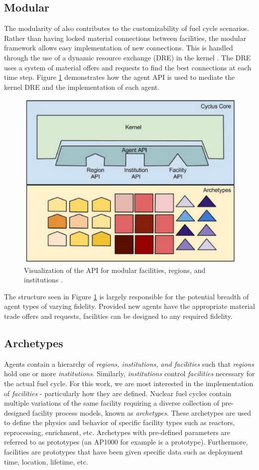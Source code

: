 \subsection{Modular}

The modularity of \Cyclus also contributes to the customizability of fuel cycle scenarios. Rather than having locked material connections between facilities, the modular
\Cyclus framework allows easy implementation of new connections. This is handled through the use of a dynamic resource exchange (DRE) in the \Cyclus kernel \cite{gidden_agent-based_2015}. 
The DRE uses a system of material offers and requests to find the best connections at each time step. Figure \ref{fig:cyc-api} demonstrates how the agent API is used to mediate
the \Cyclus kernel DRE and the implementation of each agent.  

\begin{figure}
	\centering
	\includegraphics[width=0.7\linewidth]{images/cyclus-core}
	\caption{Visualization of the \Cyclus API for modular facilities, regions, and institutions \cite{huff_fundamental_2016}.}
	\label{fig:cyc-api}
\end{figure}

The structure seen in Figure \ref{fig:cyc-api} is largely responsible for the potential breadth of agent types of varying fidelity. Provided new agents have the appropriate material trade offers and requests,
facilities can be designed to any required fidelity.

\subsection{Archetypes}

Agents contain a hierarchy of \emph{regions, institutions, and facilities} such that \emph{regions} hold one or more \emph{institutions}. Similarly, \emph{institutions}
control \emph{facilities} necessary for the actual fuel cycle. For this work, we are most interested in the implementation of \emph{facilities} - particularly how they are defined.
Nuclear fuel cycles contain multiple variations of the same facility requiring a diverse collection of pre-designed facility process models, known as \emph{archetypes}.
These archetypes are used to define the physics and behavior of specific facility types such as reactors, reprocessing, enrichment, etc. Archetypes with pre-defined parameters are referred
to as prototypes (an AP1000 for example is a prototype). Furthermore, facilities are prototypes that have been given specific data such as deployment time, location, lifetime, etc.

